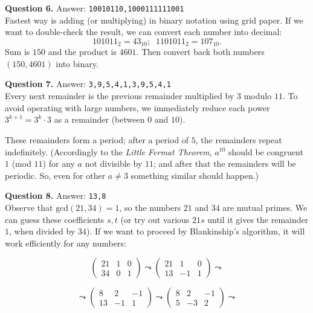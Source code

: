 \documentclass[jou]{apa6}
\begin{document}
\vspace{6pt}
{\bf Question 6.} Answer: {\tt 10010110,1000111111001}\\
Fastest way is adding (or multiplying) in binary notation using grid paper. 
If we want to double-check the result, we can convert each number into decimal:
$$101011_2 = 43_{10};\;\;1101011_2 = 107_{10}.$$
Sum is $150$ and the product is $4601$. 
Then convert back both numbers $(150, 4601)$ into binary.

\vspace{6pt}
{\bf Question 7.} Answer: {\tt 3,9,5,4,1,3,9,5,4,1}\\
Every next remainder is the previous remainder multiplied by $3$
modulo $11$. 
To avoid operating with large numbers, we immediately reduce
each power $3^{k+1} = 3^k \cdot 3$ as a remainder (between $0$ and $10$).

These remainders form a period; after a period of $5$, the remainders
repeat indefinitely. (Accordingly to the {\em Little Fermat Theorem}, 
$a^{10}$ should be congruent $1$ (mod $11$) 
for any $a$ not divisible by $11$; and after that the remainders
will be periodic.
So, even for other $a \neq 3$ something similar should happen.)

\vspace{6pt}
{\bf Question 8.} Answer: {\tt 13,8}\\
Observe that $\text{gcd}(21,34)=1$, so the numbers $21$ and $34$ are mutual primes. 
We can guess these coefficients $s,t$ (or try out various $21s$ until 
it gives the remainder $1$, when divided by $34$). If we want to proceed by 
Blankinship's algorithm, it will work efficiently for any numbers:

$$\left( \begin{array}{ccc}
21 & 1 & 0 \\
34 & 0 & 1 \end{array} \right) 
\leadsto
\left( \begin{array}{ccc}
21 & 1 & 0 \\
13 & -1 & 1 \end{array} \right) 
\leadsto$$

$$
\leadsto
\left( \begin{array}{ccc}
8 & 2 & -1 \\
13 & -1 & 1 \end{array} \right) 
\leadsto
\left( \begin{array}{ccc}
8 & 2 & -1 \\
5 & -3 & 2 \end{array} \right) 
\leadsto
$$
\end{document}
